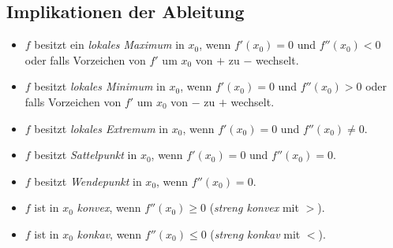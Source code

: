 \documentclass[a4paper,10pt]{article}
\begin{document}
\subsection{Implikationen der Ableitung}
\begin{itemize}
  \item $f$ besitzt ein \emph{lokales Maximum} in $x_0$, wenn $f'(x_0) = 0$ und $f''(x_0) < 0$ oder falls Vorzeichen von $f'$ um $x_0$ von $+$ zu $-$ wechselt.
  \item $f$ besitzt \emph{lokales Minimum} in $x_0$, wenn $f'(x_0) = 0$ und $f''(x_0) > 0$ oder falls Vorzeichen von $f'$ um $x_0$ von $-$ zu $+$ wechselt.
  \item $f$ besitzt \emph{lokales Extremum} in $x_0$, wenn $f'(x_0) = 0$ und $f''(x_0) \ne 0$.
  \item $f$ besitzt \emph{Sattelpunkt} in $x_0$, wenn $f'(x_0) = 0$ und $f''(x_0) = 0$.
  \item $f$ besitzt \emph{Wendepunkt} in $x_0$, wenn $f''(x_0) = 0$.
  \item $f$ ist in $x_0$ \emph{konvex}, wenn $f''(x_0) \ge 0$ (\emph{streng konvex} mit $>$).
  \item $f$ ist in $x_0$ \emph{konkav}, wenn $f''(x_0) \le 0$ (\emph{streng konkav} mit $<$).
\end{itemize}
\end{document}
